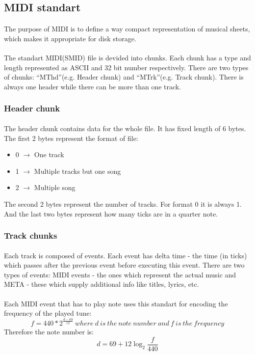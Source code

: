 \documentclass[]{article}
\begin{document}
        \subsection {MIDI standart}
        \paragraph{} The purpose of MIDI is to define a way compact representation of musical sheets, which makes it appropriate for disk storage.\paragraph{}
            The standart MIDI(SMID) file is devided into chunks. Each chunk has a type and length represented as ASCII and 32 bit number respectively. There are two types of chunks: ``MThd''(e.g. Header chunk) and ``MTrk''(e.g. Track chunk). There is always one header while there can be more than one track.
            \subsubsection{Header chunk}
            \paragraph{}The header chunk contains data for the whole file. It has fixed length of 6 bytes. The first 2 bytes represent the format of file:
                \begin{itemize}
                    \item 0 $\to$ One track
                    \item 1 $\to$ Multiple tracks but one song
                    \item 2 $\to$ Multiple song
                \end{itemize}
                The second 2 bytes represent the number of tracks. For format 0 it is always 1. And the last two bytes represent how many ticks are in a quarter note.
            \subsubsection{Track chunks}
            \paragraph{}Each track is composed of events. Each event has delta time - the time (in ticks) which passes after the previous event before executing this event. There are two types of events: MIDI events - the ones which represent the actual music and META - these which supply additional info like titles, lyrics, etc. \paragraph{}
                Each MIDI event that has to play note uses this standart for encoding the frequency of the played tune:
                $$f = 440 * 2^\frac{d - 69}{12}\ where\ d\ is\ the\ note\ number\ and\ f\ is\ the\ frequency$$
                Therefore the note number is:
                $$d = 69 + 12\log_2 \frac{f}{440}$$
\end{document}
